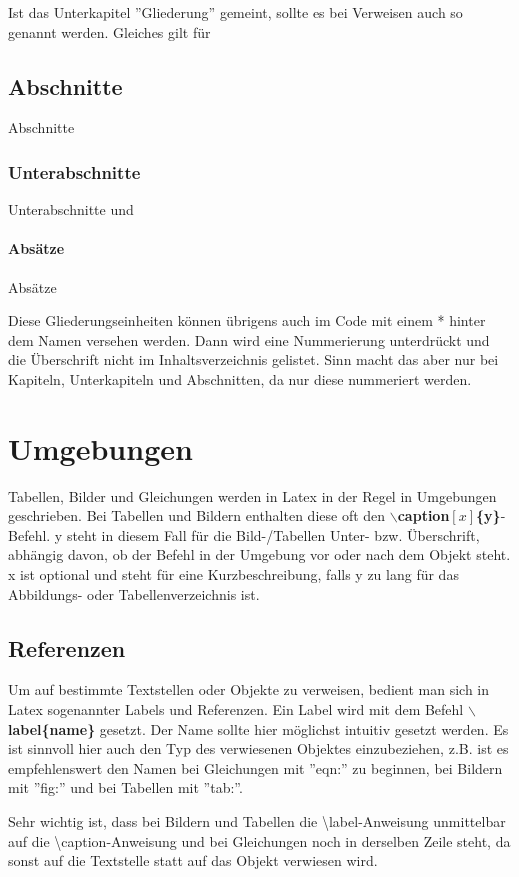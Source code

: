 			Ist das Unterkapitel ''Gliederung'' gemeint, sollte es bei
			Verweisen auch so genannt werden. Gleiches gilt für
			\subsection {Abschnitte}
			Abschnitte
			\subsubsection {Unterabschnitte}
			Unterabschnitte und
			\paragraph {Absätze}
			Absätze
			
			Diese Gliederungseinheiten können übrigens auch im Code mit einem
			* hinter dem Namen versehen werden. Dann wird eine Nummerierung
			unterdrückt und die Überschrift nicht im Inhaltsverzeichnis
			gelistet. Sinn macht das aber nur bei Kapiteln, Unterkapiteln und
			Abschnitten, da nur diese nummeriert werden.

		\section {Umgebungen}
			Tabellen, Bilder und Gleichungen werden in Latex in der Regel in
			Umgebungen geschrieben. Bei Tabellen und Bildern enthalten diese
			oft den \textbf{$\backslash$caption$[x]$\{y\}}-Befehl. y steht in
			diesem Fall für die Bild-/Tabellen Unter- bzw. Überschrift,
			abhängig davon, ob der Befehl in der Umgebung vor oder nach dem
			Objekt
			steht.\\
			x ist optional und steht für eine Kurzbeschreibung, falls y zu
			lang für das Abbildungs- oder Tabellenverzeichnis ist.
			
			\subsection {Referenzen}
			Um auf bestimmte Textstellen oder Objekte zu verweisen, bedient
			man sich in Latex sogenannter Labels und Referenzen. Ein Label
			wird mit dem Befehl \textbf{$\backslash$label\{name\}} gesetzt.
			Der Name sollte hier möglichst intuitiv gesetzt werden. Es ist
			sinnvoll hier auch den Typ des verwiesenen Objektes einzubeziehen,
			z.B. ist es empfehlenswert den Namen bei Gleichungen mit ''eqn:''
			zu beginnen, bei Bildern mit ''fig:'' und bei Tabellen mit
			''tab:''.
			
			Sehr wichtig ist, dass bei Bildern und Tabellen die
			\textbackslash label-Anweisung unmittelbar auf die
			\textbackslash caption-Anweisung und bei Gleichungen noch in derselben Zeile steht, da sonst auf die Textstelle statt auf das
			Objekt verwiesen wird.
			
